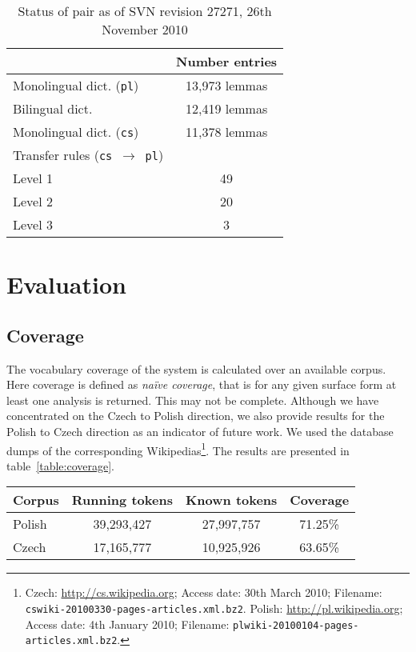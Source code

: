 \documentclass[11pt]{article}
\begin{document}
\begin{table}
\centering
\begin{tabular}{|l|c|}
\hline
                                           & Number entries\\
\hline
Monolingual dict. ({\tt pl})               & 13,973 lemmas \\
Bilingual dict.                            & 12,419 lemmas \\
Monolingual dict. ({\tt cs})               & 11,378 lemmas \\
\hline
Transfer rules ({\tt cs $\rightarrow$ pl}) &  \\
\hline
Level 1                                    & 49 \\
Level 2                                    & 20 \\
Level 3                                    & 3 \\
\hline
\end{tabular}
    \caption{Status of pair as of SVN revision 27271, 26th November 2010}
    \label{table:status}
\end{table}

\section{Evaluation}
\subsection{Coverage}

The vocabulary coverage of the system is calculated over an available corpus. Here coverage
is defined as \emph{na\"ive coverage}, that is for any given surface form at least one analysis
is returned. This may not be complete. Although we have concentrated on the Czech to Polish
direction, we also provide results for the Polish to Czech direction as an indicator of
future work.
We used the database dumps of the corresponding Wikipedias\footnote{Czech: \url{http://cs.wikipedia.org}; Access date: 30th March 2010; Filename: 
{\small\tt cswiki-20100330-pages-articles.xml.bz2}. Polish: \url{http://pl.wikipedia.org}; Access date: 4th January 2010; Filename: 
{\small\tt plwiki-20100104-pages-articles.xml.bz2}.}. The results are presented in table~\ref{table:coverage}.

\begin{table*}
\centering
\begin{tabular}{|l|c|c|c|}
\hline
Corpus & Running tokens & Known tokens & Coverage \\
\hline
Polish  & 39,293,427 & 27,997,757 & 71.25\%\\
Czech   & 17,165,777 & 10,925,926 & 63.65\%\\
\hline
\end{tabular}
    \caption{Naïve coverage for both translation directions}
    \label{table:coverage}
\end{table*}
\end{document}
